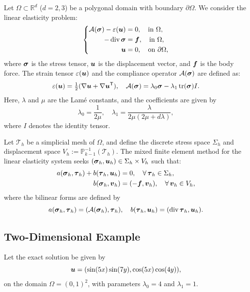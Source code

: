 \documentclass[letterpaper,12pt]{article}
\begin{document}
Let $\Omega \subset \mathbb{R}^d$ ($d = 2, 3$) be a polygonal domain with boundary $\partial \Omega$. We consider the linear elasticity problem:
\begin{equation*}
\left\{
\begin{aligned}
  \mathcal{A}(\boldsymbol{\sigma}) - \varepsilon(\boldsymbol{u}) & = 0, \quad \text{in } \Omega, \\
  -\mathop{\mathrm{div}} \boldsymbol{\sigma} &= \boldsymbol{f}, \quad \text{in } \Omega, \\
  \boldsymbol{u} &= 0, \quad \text{on } \partial \Omega,
\end{aligned}
\right.
\end{equation*}
where $\boldsymbol{\sigma}$ is the stress tensor, $\boldsymbol{u}$ is the displacement vector, and $\boldsymbol{f}$ is the body force. The strain tensor $\varepsilon(\boldsymbol{u})$ and the compliance operator $\mathcal{A}(\boldsymbol{\sigma})$ are defined as:
\[
\varepsilon(\boldsymbol{u}) = \tfrac{1}{2}(\nabla \boldsymbol{u} + \nabla \boldsymbol{u}^{\mathsf{T}}), \quad
\mathcal{A}(\boldsymbol{\sigma}) = \lambda_0 \boldsymbol{\sigma} - \lambda_1 \operatorname{tr}(\boldsymbol{\sigma}) I.
\]
Here, $\lambda$ and $\mu$ are the Lamé constants, and the coefficients are given by
\[
\lambda_0 = \frac{1}{2\mu}, \quad
\lambda_1 = \frac{\lambda}{2\mu(2\mu + d\lambda)},
\]
where $I$ denotes the identity tensor.

Let $\mathcal{T}_h$ be a simplicial mesh of $\Omega$, and define the discrete stress space $\Sigma_h$ and displacement space $V_h := \mathbb{P}_{k-1}^{-1}(\mathcal{T}_h)$. The mixed finite element method for the linear elasticity system seeks $(\boldsymbol{\sigma}_h, \boldsymbol{u}_h) \in \Sigma_h \times V_h$ such that:
\begin{equation}
\begin{aligned}
    a(\boldsymbol{\sigma}_h, \boldsymbol{\tau}_h) + b(\boldsymbol{\tau}_h, \boldsymbol{u}_h) &= 0, \quad \forall\, \boldsymbol{\tau}_h \in \Sigma_h, \\
    b(\boldsymbol{\sigma}_h, \boldsymbol{v}_h) &= (-\boldsymbol{f}, \boldsymbol{v}_h), \quad \forall\, \boldsymbol{v}_h \in V_h,
\end{aligned}
\end{equation}
where the bilinear forms are defined by
\[
a(\boldsymbol{\sigma}_h, \boldsymbol{\tau}_h) = (\mathcal{A}(\boldsymbol{\sigma}_h), \boldsymbol{\tau}_h), \quad
b(\boldsymbol{\tau}_h, \boldsymbol{u}_h) = (\mathop{\mathrm{div}} \boldsymbol{\tau}_h, \boldsymbol{u}_h).
\]

\subsection{Two-Dimensional Example}

Let the exact solution be given by
\[
\boldsymbol{u} = (\sin(5x)\sin(7y), \cos(5x)\cos(4y)),
\]
on the domain $\Omega = (0,1)^2$, with parameters $\lambda_0 = 4$ and $\lambda_1 = 1$.
\end{document}
